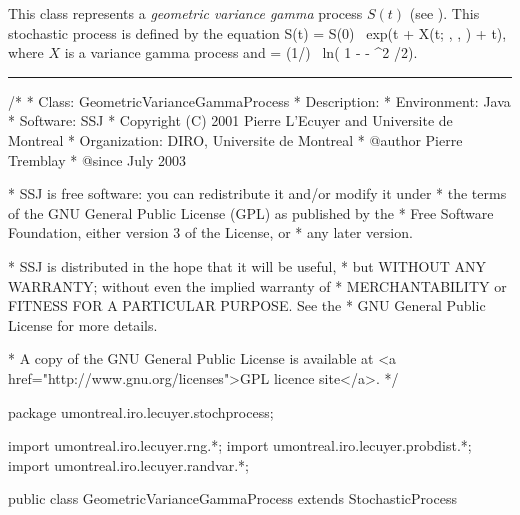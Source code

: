 %
%


This class represents a \emph{geometric variance gamma} process $S(t)$
(see \cite[page 86]{fMAD98a}). This stochastic process is defined by the
equation
\eq
S(t) = S(0) \mbox{ exp}(\mu t + X(t; \sigma, \nu, \theta) + \omega t),
\label{GeoVGeqn}
\endeq
where $X$ is a variance gamma process and
\eq
\omega = (1/\nu) \mbox{ ln}( 1 - \theta \nu - \sigma^{2} \nu /2).
\label{omegaEqn}
\endeq

\bigskip\hrule\bigskip

\begin{code}
\begin{hide}
/*
 * Class:        GeometricVarianceGammaProcess
 * Description:  
 * Environment:  Java
 * Software:     SSJ 
 * Copyright (C) 2001  Pierre L'Ecuyer and Universite de Montreal
 * Organization: DIRO, Universite de Montreal
 * @author       Pierre Tremblay
 * @since        July 2003

 * SSJ is free software: you can redistribute it and/or modify it under
 * the terms of the GNU General Public License (GPL) as published by the
 * Free Software Foundation, either version 3 of the License, or
 * any later version.

 * SSJ is distributed in the hope that it will be useful,
 * but WITHOUT ANY WARRANTY; without even the implied warranty of
 * MERCHANTABILITY or FITNESS FOR A PARTICULAR PURPOSE.  See the
 * GNU General Public License for more details.

 * A copy of the GNU General Public License is available at
   <a href="http://www.gnu.org/licenses">GPL licence site</a>.
 */
\end{hide}
package umontreal.iro.lecuyer.stochprocess;\begin{hide}
import umontreal.iro.lecuyer.rng.*;
import umontreal.iro.lecuyer.probdist.*;
import umontreal.iro.lecuyer.randvar.*;

\end{hide}

public class GeometricVarianceGammaProcess extends StochasticProcess \begin{hide} {
    protected VarianceGammaProcess vargamma;
    protected double        theta,
                            nu,
                            mu,
                            sigma,
                            omega,
                            muPlusOmega;
    protected double[]      mudt;
\end{hide}
\end{code}
